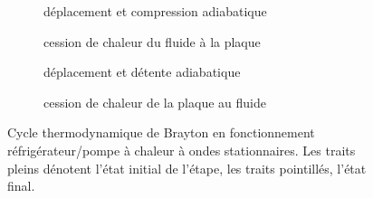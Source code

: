 \begin{figure}[!htp]
	\centering
	\begin{subfigure}{.47\textwidth}
		\centering
		
		\caption{déplacement et compression adiabatique}
		\label{fig:CycleBrayton_DepCompAdiab}
	\end{subfigure}
	\begin{subfigure}{.47\textwidth}
		\centering
		
		\caption{cession de chaleur du fluide à la plaque}
		\label{fig:CycleBrayton_QFluidePlaque}
	\end{subfigure}
	
	\vspace{5mm}
	\begin{subfigure}{.47\textwidth}
		\centering
		
		\caption{déplacement et détente adiabatique}
		\label{fig:CycleBrayton_DepDetAdiab}
	\end{subfigure}
	\begin{subfigure}{.47\textwidth}
		\centering
		
		\caption{cession de chaleur de la plaque au fluide}
		\label{fig:CycleBrayton_QPlaqueToFluide}
	\end{subfigure}	
	\caption[Cycle de Brayton des machines à ondes stationnaires]{Cycle thermodynamique de Brayton en fonctionnement réfrigérateur/pompe à chaleur à ondes stationnaires. Les traits pleins dénotent l'état initial de l'étape, les traits pointillés, l'état final.}
	\label{fig:CycleBrayton}
\end{figure} %

